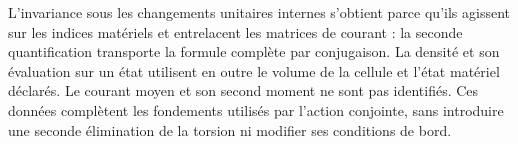 L’invariance sous les changements unitaires internes s’obtient parce qu’ils agissent sur les indices matériels et entrelacent les matrices de courant : la seconde quantification transporte la formule complète par conjugaison. La densité et son évaluation sur un état utilisent en outre le volume de la cellule et l’état matériel déclarés. Le courant moyen et son second moment ne sont pas identifiés. Ces données complètent les fondements utilisés par l’action conjointe, sans introduire une seconde élimination de la torsion ni modifier ses conditions de bord.
